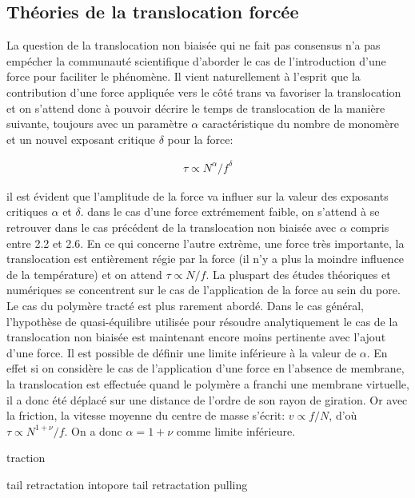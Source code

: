 \subsection{Théories de la translocation forcée}

La question de la translocation non biaisée qui ne fait pas consensus n'a pas empécher la communauté scientifique d'aborder le cas de l'introduction d'une force pour faciliter le phénomène. Il vient naturellement à l'esprit que la contribution d'une force appliquée vers le côté trans va favoriser la translocation et on s'attend donc à pouvoir décrire le temps de translocation de la manière suivante, toujours avec un paramètre $\alpha$ caractéristique du nombre de monomère et un nouvel exposant critique $\delta$ pour la force:

\begin{eqnarray}
\tau \propto N^\alpha / f^\delta
\label{taubiased}
\end{eqnarray}

il est évident que l'amplitude de la force va influer sur la valeur des exposants critiques $\alpha$ et $\delta$. dans le cas d'une force extrémement faible, on s'attend à se retrouver dans le cas précédent de la translocation non biaisée avec $\alpha$ compris entre 2.2 et 2.6. En ce qui concerne l'autre extrème, une force très importante, la translocation est entièrement régie par la force (il n'y a plus la moindre influence de la température) et on attend $\tau \propto N/f$.
 La pluspart des études théoriques et numériques se concentrent sur le cas de l'application de la force au sein du pore. Le cas du polymère tracté est plus rarement abordé.
 Dans le cas général, l'hypothèse de quasi-équilibre utilisée pour résoudre analytiquement le cas de la translocation non biaisée est maintenant encore moins pertinente avec l'ajout d'une force. Il est possible de définir une limite inférieure à la valeur de $\alpha$. En effet si on considère le cas de l'application d'une force en l'absence de membrane, la translocation est effectuée quand le polymère a franchi une membrane virtuelle, il a donc été déplacé sur une distance de l'ordre de son rayon de giration. Or avec la friction, la vitesse moyenne du centre de masse s'écrit: $v \propto f/N$, d'où $\tau \propto N^{1+\nu}/f$. On a donc $\alpha=1+\nu$ comme limite inférieure.
 
 
 

 \cite{Kantor2004} traction
 
 \cite{Ikonen2012} tail retractation intopore
  \cite{ Huopaniemi2007} tail retractation pulling

